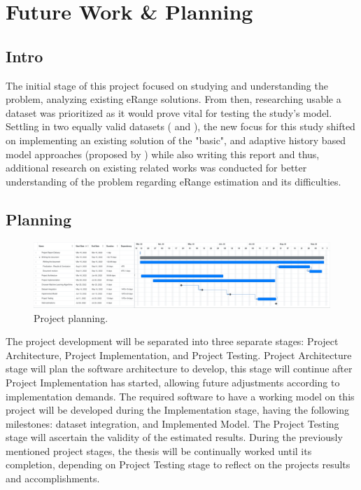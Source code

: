 \chapter{Future Work \& Planning}
\label{cha:planning}
\section{Intro}
\label{sec:planningIntro}
The initial stage of this project focused on 
studying and understanding the problem,
analyzing existing \gls{eRange} solutions.
From then, researching usable a \gls{dataset}
was prioritized as it would prove vital
for testing the study's model.
Settling in two equally valid \glspl{dataset}
(\cite{vedDataset} and \cite{emobpy}),
the new focus for this study shifted on
implementing an existing solution of 
the "basic", and adaptive history based model
approaches (proposed by \cite{classicEVX})
while also writing this report and thus,
additional research on existing related works 
was conducted for better understanding
of the problem regarding \gls{eRange} estimation
and its difficulties.

\section{Planning}
\label{sec:planningPlanning}

\begin{figure}[H]
    \begin{center}
        \includegraphics[scale=0.20]{../figures/planning}
        \caption{Project planning.}
    \end{center}
\end{figure}

The project development will be separated into three 
separate stages: Project Architecture, 
Project Implementation, and Project Testing.
Project Architecture stage will plan the software
architecture to develop, this stage will continue 
after Project Implementation has started, allowing
future adjustments according to implementation demands.
The required software to have a working model on this project
will be developed during the Implementation stage,
having the following milestones: \Gls{dataset} integration, 
and Implemented Model. The Project Testing stage
will ascertain the validity of the estimated results. 
During the previously mentioned project stages, 
the thesis will be continually worked until
its completion, depending on Project Testing stage
to reflect on the projects results and accomplishments.
